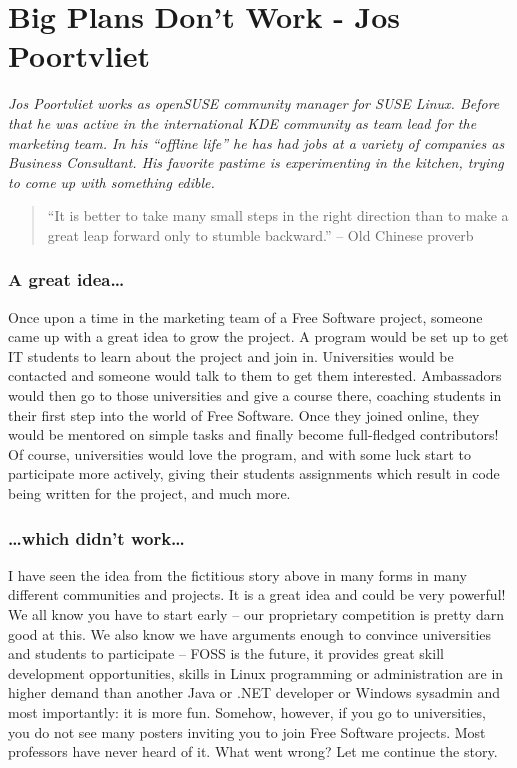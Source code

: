 \chapter{Big Plans Don't Work - Jos Poortvliet}

\textit{Jos Poortvliet works as openSUSE community manager for SUSE Linux.
Before that he was active in the international KDE community as team lead for
the marketing team. In his ``offline life'' he has had jobs at a variety of
companies as Business Consultant. His favorite pastime is experimenting in the
kitchen, trying to come up with something edible.}

\begin{quote}``It is better to take many small steps in the right direction than
to make a great leap forward only to stumble backward.'' -- Old Chinese
proverb\end{quote}

\subsection*{A great idea\dots}
Once upon a time in the marketing team of a Free Software project, someone came
up with a great idea to grow the project. A program would be set up to get IT
students to learn about the project and join in. Universities would be contacted
and someone would talk to them to get them interested. Ambassadors would then go
to those universities and give a course there, coaching students in their first
step into the world of Free Software. Once they joined online, they would be
mentored on simple tasks and finally become full-fledged contributors! Of
course, universities would love the program, and with some luck start to
participate more actively, giving their students assignments which result in
code being written for the project, and much more.

\subsection*{\dots which didn't work\dots}
I have seen the idea from the fictitious story above in many forms in many
different communities and projects. It is a great idea and could be very
powerful! We all know you have to start early -- our proprietary competition is
pretty darn good at this. We also know we have arguments enough to convince
universities and students to participate -- FOSS is the future, it provides
great skill development opportunities, skills in Linux programming or
administration are in higher demand than another Java or .NET developer or
Windows sysadmin and most importantly: it is more fun. Somehow, however, if you go
to universities, you do not see many posters inviting you to join Free Software
projects. Most professors have never heard of it. What went wrong? Let me
continue the story.

